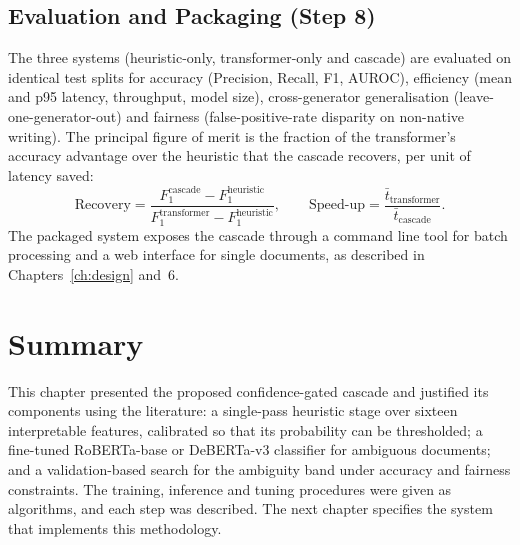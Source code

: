 \subsection{Evaluation and Packaging (Step 8)}

The three systems (heuristic-only, transformer-only and cascade) are evaluated
on identical test splits for accuracy (Precision, Recall, F1, AUROC),
efficiency (mean and p95 latency, throughput, model size), cross-generator
generalisation (leave-one-generator-out) and fairness (false-positive-rate
disparity on non-native writing). The principal figure of merit is the
fraction of the transformer's accuracy advantage over the heuristic that the
cascade recovers, per unit of latency saved:
\begin{equation}
  \text{Recovery} = \frac{F_1^{\text{cascade}} - F_1^{\text{heuristic}}}{F_1^{\text{transformer}} - F_1^{\text{heuristic}}},
  \qquad
  \text{Speed-up} = \frac{\bar{t}_{\text{transformer}}}{\bar{t}_{\text{cascade}}}.
  \label{eq:recovery}
\end{equation}
The packaged system exposes the cascade through a command line tool for batch
processing and a web interface for single documents, as described in
Chapters~\ref{ch:design} and~6.

\section{Summary}

This chapter presented the proposed confidence-gated cascade and justified its
components using the literature: a single-pass heuristic stage over sixteen
interpretable features, calibrated so that its probability can be thresholded;
a fine-tuned RoBERTa-base or DeBERTa-v3 classifier for ambiguous documents;
and a validation-based search for the ambiguity band under accuracy and
fairness constraints. The training, inference and tuning procedures were given
as algorithms, and each step was described. The next chapter specifies the
system that implements this methodology.
